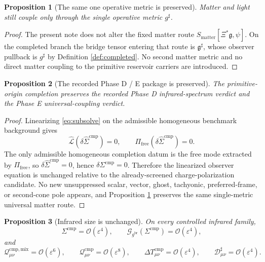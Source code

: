 \documentclass[11pt]{article}
\newcommand{\ObserverMap}{\Xi}
\newcommand{\BridgeMetric}{\mathfrak g}
\newcommand{\ObserverMetric}{g^{\mathrm{br}}}
\newcommand{\CompletedMetric}{g^{\sharp}}
\newcommand{\CompShift}{\Sigma^{\mathrm{cmp}}}
\newcommand{\CompLift}{\widehat\Sigma^{\mathrm{cmp}}}
\newcommand{\SubReducedEin}{\widehat{\mathcal L}}
\newcommand{\FreeProj}{\Pi_{\mathrm{free}}}
\newcommand{\GaugeBook}{\mathcal G_{\ObserverMetric}}
\newcommand{\CompMix}{\mathcal Q_{\mu\nu}^{\mathrm{cmp,mix}}}
\newcommand{\CompQuad}{\mathcal Q_{\mu\nu}^{\mathrm{cmp}}}
\newcommand{\CompDec}{\mathcal D_{\mu\nu}^{\sharp}}
\newcommand{\DeltaTComp}{\Delta T_{\mu\nu}^{\mathrm{cmp}}}
\newcommand{\MatterAct}{S_{\mathrm{matter}}}
\newcommand{\epsIR}{\varepsilon}
\newtheorem{proposition}{Proposition}
\begin{document}
\begin{proposition}[The same one operative metric is preserved]
\label{prop:onemetric}
Matter and light still couple only through the single operative metric \(\CompletedMetric\).
\end{proposition}

\begin{proof}
The present note does not alter the fixed matter route \(\MatterAct[\ObserverMap^*\BridgeMetric,\psi]\). On the completed branch the bridge tensor entering that route is \(\BridgeMetric^\sharp\), whose observer pullback is \(\CompletedMetric\) by Definition \ref{def:completed}. No second matter metric and no direct matter coupling to the primitive reservoir carriers are introduced.
\end{proof}

\begin{proposition}[The recorded Phase D / E package is preserved]
\label{prop:phaseDE}
The primitive-origin completion preserves the recorded Phase D infrared-spectrum verdict and the Phase E universal-coupling verdict.
\end{proposition}

\begin{proof}
Linearizing \eqref{eq:subsolve} on the admissible homogeneous benchmark background gives
\[
\SubReducedEin(\delta\CompLift)=0,
\qquad
\FreeProj(\delta\CompLift)=0.
\]
The only admissible homogeneous completion datum is the free mode extracted by \(\FreeProj\), so \(\delta\CompLift=0\), hence \(\delta\CompShift=0\). Therefore the linearized observer equation is unchanged relative to the already-screened charge-polarization candidate. No new unsuppressed scalar, vector, ghost, tachyonic, preferred-frame, or second-cone pole appears, and Proposition \ref{prop:onemetric} preserves the same single-metric universal matter route.
\end{proof}

\begin{proposition}[Infrared size is unchanged]
\label{prop:size}
On every controlled infrared family,
\begin{equation}
\CompShift=\mathcal O(\epsIR^4),
\qquad
\GaugeBook(\CompShift)=\mathcal O(\epsIR^4),
\label{eq:ircomp}
\end{equation}
and
\begin{equation}
\CompMix=\mathcal O(\epsIR^6),
\qquad
\CompQuad=\mathcal O(\epsIR^8),
\qquad
\DeltaTComp=\mathcal O(\epsIR^4),
\qquad
\CompDec=\mathcal O(\epsIR^4).
\label{eq:irsizes}
\end{equation}
\end{proposition}
\end{document}
